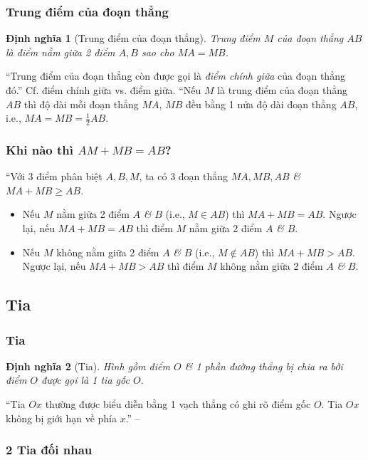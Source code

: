 \documentclass{article}
\numberwithin{equation}{section}
\newtheorem{definition}{Định nghĩa}[section]
\begin{document}
\subsubsection{Trung điểm của đoạn thẳng}

\begin{definition}[Trung điểm của đoạn thẳng]
	\emph{Trung điểm $M$} của đoạn thẳng $AB$ là điểm nằm giữa 2 điểm $A,B$ sao cho $MA = MB$.
\end{definition}
``Trung điểm của đoạn thẳng còn được gọi là \textit{điểm chính giữa} của đoạn thẳng đó.'' Cf. điểm chính giữa vs. điểm giữa. ``Nếu $M$ là trung điểm của đoạn thẳng $AB$ thì độ dài mỗi đoạn thẳng $MA$, $MB$ đều bằng 1 nửa độ dài đoạn thẳng $AB$, i.e., $MA = MB = \frac{1}{2}AB$.

\subsubsection{Khi nào thì $AM + MB = AB$?}
``Với 3 điểm phân biệt $A,B,M$, ta có 3 đoạn thẳng $MA,MB,AB$ \textit{\&} $MA + MB\ge AB$.
\begin{itemize}
	\item Nếu $M$ nằm giữa 2 điểm $A$ \textit{\&} $B$ (i.e., $M\in AB$) thì $MA + MB = AB$. Ngược lại, nếu $MA + MB = AB$ thì điểm $M$ nằm giữa 2 điểm $A$ \textit{\&} $B$.
	\item Nếu $M$ không nằm giữa 2 điểm $A$ \textit{\&} $B$ (i.e., $M\notin AB$) thì $MA + MB > AB$. Ngược lại, nếu $MA + MB > AB$ thì điểm $M$ không nằm giữa 2 điểm $A$ \textit{\&} $B$.
\end{itemize}

\subsection{Tia}

\subsubsection{Tia}

\begin{definition}[Tia]
	Hình gồm điểm $O$ \textit{\&} 1 phần đường thẳng bị chia ra bởi điểm $O$ được gọi là 1 \textit{tia gốc $O$}.
\end{definition}
``Tia $Ox$ thường được biểu diễn bằng 1 vạch thẳng có ghi rõ điểm gốc $O$. Tia $Ox$ không bị giới hạn về phía $x$.'' -- \cite[p. 89]{Thai_Anh_Dat_Ha_Loan_Nam_Quang_Toan_6_tap_2}

\subsubsection{2 Tia đối nhau}
\end{document}
